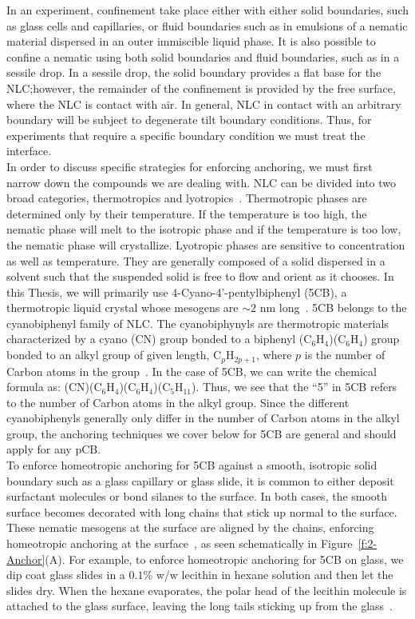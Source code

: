 In an experiment, confinement take place either with either solid boundaries, such as glass cells and capillaries, or fluid boundaries such as in emulsions of a nematic material dispersed in an outer immiscible liquid phase.
It is also possible to confine a nematic using both solid boundaries and fluid boundaries, such as in a sessile drop.
In a sessile drop, the solid boundary provides a flat base for the NLC;\@ however, the remainder of the confinement is provided by the free surface, where the NLC is contact with air.
In general, NLC in contact with an arbitrary boundary will be subject to degenerate tilt boundary conditions.
Thus, for experiments that require a specific boundary condition we must treat the interface.\\

In order to discuss specific strategies for enforcing anchoring, we must first narrow down the compounds we are dealing with.
NLC can be divided into two broad categories, thermotropics and lyotropics~\cite{RN33}.
Thermotropic phases are determined only by their temperature.
If the temperature is too high, the nematic phase will melt to the isotropic phase and if the temperature is too low, the nematic phase will crystallize.
Lyotropic phases are sensitive to concentration as well as temperature.
They are generally composed of a solid dispersed in a solvent such that the suspended solid is free to flow and orient as it chooses.
In this Thesis, we will primarily use 4-Cyano-4'-pentylbiphenyl (5CB), a thermotropic liquid crystal whose mesogens are $\sim 2$ nm long~\cite{RN33}.\@
5CB belongs to the cyanobiphenyl family of NLC.
The cyanobiphynyls are thermotropic materials characterized by a cyano (CN) group  bonded to a biphenyl (C$_6$H$_4$)(C$_6$H$_4$) group bonded to an alkyl group of given length, C$_p$H$_{2p+1}$, where $p$ is the number of Carbon atoms in the group~\cite{RN33}.
In the case of 5CB, we can write the chemical formula as: (CN)(C$_6$H$_4$)(C$_6$H$_4$)(C$_5$H$_{11}$).
Thus, we see that the ``5'' in 5CB refers to the number of Carbon atoms in the alkyl group.
Since the different cyanobiphenyls generally only differ in the number of Carbon atoms in the alkyl group, the anchoring techniques we cover below for 5CB are general and should apply for any pCB. \\

To enforce homeotropic anchoring for 5CB against a smooth, isotropic solid boundary such as a glass capillary or glass slide, it is common to either deposit surfactant molecules or bond silanes to the surface.
In both cases, the smooth surface becomes decorated with long chains that stick up normal to the surface.
These nematic mesogens at the surface are aligned by the chains, enforcing homeotropic anchoring at the surface~\cite{RN33}, as seen schematically in Figure~\ref{f:2-Anchor}(A).
For example, to enforce homeotropic anchoring for 5CB on glass, we dip coat glass slides in a $0.1$\% w/w lecithin in hexane solution and then let the slides dry.
When the hexane evaporates, the polar head of the lecithin molecule is attached to the glass surface, leaving the long tails sticking up from the glass~\cite{RN140}.\\

